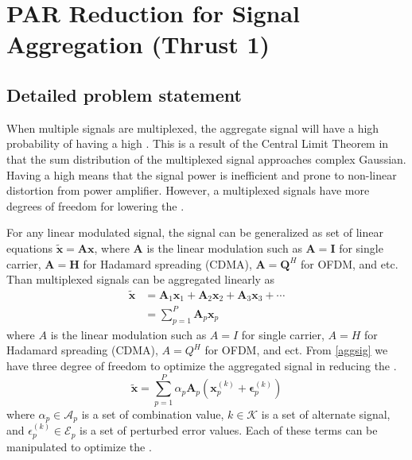 \section{PAR Reduction for Signal Aggregation (Thrust 1)}
\subsection{Detailed problem statement}

When multiple signals are multiplexed, the aggregate signal will have a high probability of having a high \PAR.  This is a result of the Central Limit Theorem in that the sum distribution of the multiplexed signal approaches complex Gaussian.  Having a high \PAR means that the signal power is inefficient and prone to non-linear distortion from power amplifier.  However, a multiplexed signals have more degrees of freedom for lowering the \PAR.

For any linear modulated signal, the signal can be generalized as set of linear equations $\mathbf{\tilde{x}}=\mathbf{Ax}$, where $\mathbf{A}$ is the linear modulation such as $\mathbf{A}=\mathbf{I}$ for single carrier, $\mathbf{A}=\mathbf{H}$ for Hadamard spreading (CDMA), $\mathbf{A}=\mathbf{Q}^H$ for OFDM, and etc.  Than multiplexed signals can be aggregated linearly as
\begin{equation}
\begin{aligned}
\mathbf{\tilde{x}}&=\mathbf{A}_1\mathbf{x}_1+\mathbf{A}_2\mathbf{x}_2+\mathbf{A}_3\mathbf{x}_3+\cdots\\
&=\sum_{p=1}^P\mathbf{A}_p\mathbf{x}_p
\end{aligned}
\label{aggsig}
\end{equation}
where $A$ is the linear modulation such as $A=I$ for single carrier, $A=H$ for Hadamard spreading (CDMA), $A=Q^H$ for OFDM, and ect.
From \eqref{aggsig} we have three degree of freedom to optimize the aggregated signal in reducing the \PAR.  
\begin{equation}
{\mathbf{\tilde{x}}}=\sum_{p=1}^P\alpha_p\mathbf{A}_p\left(\mathbf{x}_p^{(k)}+\mathbf{\epsilon}_p^{(k)}\right)
\label{xGen}
\end{equation}
where $\alpha_p\in\mathcal{A}_p$ is a set of combination value, $k\in \mathcal{K}$ is a set of alternate signal, and $\epsilon_p^{(k)}\in\mathcal{E}_p$ is a set of perturbed error values.  Each of these terms can be manipulated to optimize the \PAR.

